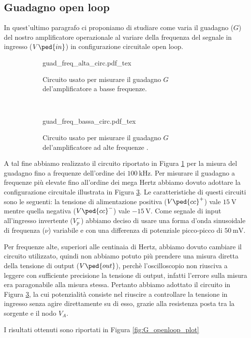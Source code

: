 \subsection*{Guadagno open loop}

In quest'ultimo paragrafo ci proponiamo di studiare come varia il guadagno ($G$) del nostro amplificatore operazionale al variare della frequenza del segnale in ingresso ($V\ped{in}$) in configurazione circuitale open loop.

\begin{figure}[h]
        \centering
        \begin{subfigure}[b]{0.45\textwidth}
        		\def\svgwidth{\textwidth}
                {guad_freq_alta_circ.pdf_tex}
                \caption{Circuito usato per misurare il guadagno $G$ del'amplificatore a basse frequenze.}
                \label{fig:G_open_loop_basso}
        \end{subfigure}
        ~
        \begin{subfigure}[b]{0.45\textwidth}
        		\def\svgwidth{\textwidth}
                {guad_freq_bassa_circ.pdf_tex}
                \caption{Circuito usato per misurare il guadagno $G$ del'amplificatore ad alte frequenze .}
                \label{fig:G_open_loop_alto}
        \end{subfigure}
        \caption{}
\end{figure}

A tal fine abbiamo realizzato il circuito riportato in Figura \ref{fig:G_open_loop_basso} per la misura del guadagno fino a frequenze dell'ordine dei $\SI{100}{\kilo\hertz}$. Per misurare il guadagno a frequenze più elevate fino all'ordine dei mega Hertz abbiamo dovuto adottare la configurazione circuitale illustrata in Figura \ref{fig:G_open_loop_alto}. Le caratteristiche di questi circuiti sono le seguenti: la tensione di alimentazione positiva ($V\ped{cc}^+$) vale $\SI{+15}{\volt}$ mentre quella negativa ($V\ped{cc}^-$) vale $\SI{-15}{\volt}$. Come segnale di input all'ingresso invertente ($V_p^-$) abbiamo deciso di usare una forma d'onda sinusoidale di frequenza ($\nu$) variabile e con una differenza di potenziale picco-picco di $\SI{50}{\milli\volt}$.

Per frequenze alte, superiori alle centinaia di Hertz, abbiamo dovuto cambiare il circuito utilizzato, quindi non abbiamo potuto più prendere una misura diretta della tensione di output ($V\ped{out}$), perchè l'oscilloscopio non riusciva a leggere con sufficiente precisione la tensione di output, infatti l'errore sulla misura era paragonabile alla misura stessa.
Pertanto abbiamo adottato il circuito in Figura \ref{fig:G_open_loop_alto}, la cui potenzialità consiste nel riuscire a controllare la tensione in ingresso senza agire direttamente su di esso, grazie alla resistenza posta tra la sorgente e il nodo $V_A$.

I risultati ottenuti sono riportati in Figura \ref{fig:G_openloop_plot}